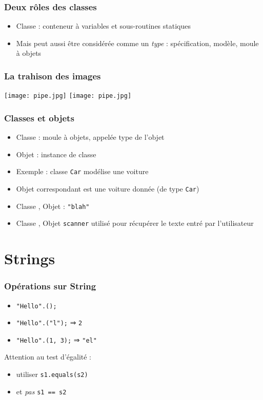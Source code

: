 \documentclass[english, french]{beamer}
\begin{document}
\begin{frame}
	\frametitle{Deux rôles des classes}
	\begin{itemize}
		\item Classe : conteneur à variables et sous-routines statiques
		\item Mais peut aussi être considérée comme un \emph{type} : spécification, modèle, moule à objets
	\end{itemize}
\end{frame}

\begin{frame}
	\frametitle{La trahison des images}
	\centering
	\begin{overprint}
			\texttt{[image: pipe.jpg]}
		\onslide<2>
			\texttt{[image: pipe.jpg]}
	\end{overprint}
\end{frame}

\begin{frame}
	\frametitle{Classes et objets}
	\begin{itemize}
		\item Classe : moule à objets, appelée type de l’objet
		\item Objet : instance de classe
		\item Exemple : classe \texttt{Car} modélise une voiture
		\item Objet correspondant est une voiture donnée (de type \texttt{Car})
		\item Classe , Objet : \texttt{"blah"}
		\item Classe , Objet \texttt{scanner} utilisé pour récupérer le texte entré par l’utilisateur
	\end{itemize}
\end{frame}

\section{Strings}
\begin{frame}
	\frametitle{Opérations sur String}
	\begin{itemize}
		\item \texttt{"Hello".();}
		\item \texttt{"Hello".("l");} ⇒ \pause \texttt{2}
		\item \texttt{"Hello".(1, 3);} ⇒ \pause \texttt{"el"}
	\end{itemize}
	Attention au test d’égalité :
	\begin{itemize}
		\item[\mkkOK] utiliser \texttt{s1.equals(s2)} 
		\item[\mkkNO] et \emph{pas} \texttt{s1 == s2}
	\end{itemize}
\end{frame}
\end{document}
